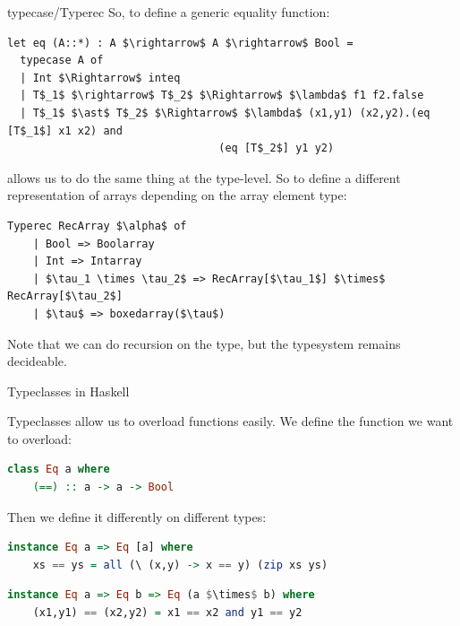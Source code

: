 \documentclass[portrait,final,paperwidth=40in,paperheight=40in]{baposter}
\begin{document}
{\begin{poster}
\begin{posterbox}[name=tcase,column=1,below=tyop]{typecase/Typerec}
  So, to define a generic equality function:

  \begin{lstlisting}[mathescape]
  let eq (A::*) : A $\rightarrow$ A $\rightarrow$ Bool =
  typecase A of
  | Int $\Rightarrow$ inteq
  | T$_1$ $\rightarrow$ T$_2$ $\Rightarrow$ $\lambda$ f1 f2.false
  | T$_1$ $\ast$ T$_2$ $\Rightarrow$ $\lambda$ (x1,y1) (x2,y2).(eq [T$_1$] x1 x2) and
                                 (eq [T$_2$] y1 y2)

  \end{lstlisting}

   allows us to do the same thing at the type-level.
  So to define a different representation of arrays depending on the
  array element type:

  \begin{lstlisting}[mathescape]
    Typerec RecArray $\alpha$ of
    | Bool => Boolarray
    | Int => Intarray
    | $\tau_1 \times \tau_2$ => RecArray[$\tau_1$] $\times$ RecArray[$\tau_2$]
    | $\tau$ => boxedarray($\tau$)
  \end{lstlisting}

  Note that we can do recursion on the type, but the typesystem remains
  decideable.
  \end{posterbox}

  \begin{posterbox}[name=tclass,column=2]{Typeclasses in Haskell}
    
  Typeclasses allow us to overload functions easily.
  We define the function we want to overload:

  \begin{lstlisting}[language=Haskell]
    class Eq a where
    (==) :: a -> a -> Bool
  \end{lstlisting}

  Then we define it differently on different types:
  \begin{lstlisting}[language=Haskell]
    instance Eq a => Eq [a] where
    xs == ys = all (\ (x,y) -> x == y) (zip xs ys)
  \end{lstlisting}

  \begin{lstlisting}[language=Haskell,mathescape]
    instance Eq a => Eq b => Eq (a $\times$ b) where
    (x1,y1) == (x2,y2) = x1 == x2 and y1 == y2
  \end{lstlisting}


\end{posterbox}
\end{poster}}
\end{document}
